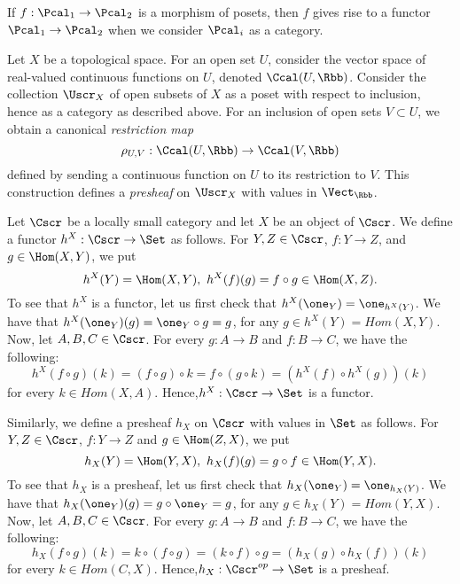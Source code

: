 \begin{example}
  If $f : \Pcal_{1} \to \Pcal_{2}$ is a morphism of posets, then $f$ gives rise to a functor $\Pcal_{1} \to \Pcal_{2}$ when we consider $\Pcal_{i}$ as a category.
\end{example}

\begin{example}
  Let $X$ be a topological space.
  For an open set $U$, consider the vector space of real-valued continuous functions on $U$, denoted $\Ccal(U,\Rbb)$.
  Consider the collection $\Uscr_{X}$ of open subsets of $X$ as a poset with respect to inclusion, hence as a category as described above.
  For an inclusion of open sets $V \subset U$, we obtain a canonical \emph{restriction map}
  \[ \rho_{U,V}: \Ccal(U,\Rbb) \to \Ccal(V,\Rbb) \]
  defined by sending a continuous function on $U$ to its restriction to $V$.
  This construction defines a \emph{presheaf} on $\Uscr_{X}$ with values in $\Vect_{\Rbb}$.
\end{example}

\begin{example}
  Let $\Cscr$ be a locally small category and let $X$ be an object of $\Cscr$.
  We define a functor $h^{X} : \Cscr \to \Set$ as follows.
  For $Y, Z \in \Cscr$, $f : Y \to Z$, and $g \in \Hom(X,Y)$, we put
  \[ h^{X}(Y) = \Hom(X,Y), \ h^{X}(f)(g) = f \circ g \in \Hom(X,Z). \]
  To see that $h^X$ is a functor, let us first check that $h^X(\one_Y)=\one_{h^X(Y)}$.
  We have that $h^X(\one_Y)(g)=\one_Y\circ g=g$, for any $g\in h^X(Y)=Hom(X,Y)$.
  Now, let $A,B,C \in \Cscr$. For every $g:A\to B$ and $f:B\to C$, we have the following:
  \[h^X(f\circ g)(k)=(f\circ g)\circ k=f\circ (g\circ k)=(h^X(f)\circ h^X(g))(k)\]
for every $k\in Hom(X,A)$.
Hence,$h^{X} : \Cscr \to \Set$ is a functor.

  Similarly, we define a presheaf $h_{X}$ on $\Cscr$ with values in $\Set$ as follows.
  For $Y,Z \in \Cscr$, $f : Y \to Z$ and $g \in \Hom(Z,X)$, we put
  \[ h_{X}(Y) = \Hom(Y,X), \ h_{X}(f)(g) = g \circ f \in \Hom(Y,X). \]
    To see that $h_X$ is a presheaf, let us first check that $h_X(\one_Y)=\one_{h_X(Y)}$.
  We have that $h_X(\one_Y)(g)=g\circ\one_Y=g$, for any $g\in h_X(Y)=Hom(Y,X)$.
  Now, let $A,B,C \in \Cscr$. For every $g:A\to B$ and $f:B\to C$, we have the following:
  \[h_X(f\circ g)(k)=k\circ (f\circ g)=(k\circ f)\circ g=(h_X(g)\circ h_X(f))(k)\]
for every $k\in Hom(C,X)$.
Hence,$h_{X} : \Cscr^{op} \to \Set$ is a presheaf.
  
\end{example}

